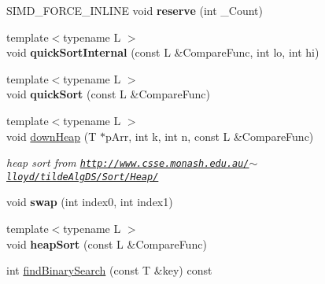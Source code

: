 \begin{DoxyCompactItemize}
\mbox{\label{classbtAlignedObjectArray_a0bcdc850355c6742c66d50b16b102d9d}} 
S\+I\+M\+D\+\_\+\+F\+O\+R\+C\+E\+\_\+\+I\+N\+L\+I\+NE void {\bfseries reserve} (int \+\_\+\+Count)
\item 
\mbox{\label{classbtAlignedObjectArray_afd02193777d3644c1202bd430cd47ec3}} 
{\footnotesize template$<$typename L $>$ }\\void {\bfseries quick\+Sort\+Internal} (const L \&Compare\+Func, int lo, int hi)
\item 
\mbox{\label{classbtAlignedObjectArray_a96e9890d9c406d43b53b0e5ff0723b2f}} 
{\footnotesize template$<$typename L $>$ }\\void {\bfseries quick\+Sort} (const L \&Compare\+Func)
\item 
\mbox{\label{classbtAlignedObjectArray_af763a60de2f11089bb10ebff2c062642}} 
{\footnotesize template$<$typename L $>$ }\\void \hyperlink{classbtAlignedObjectArray_af763a60de2f11089bb10ebff2c062642}{down\+Heap} (T $\ast$p\+Arr, int k, int n, const L \&Compare\+Func)
\begin{DoxyCompactList}\small\item\em heap sort from \href{http://www.csse.monash.edu.au/~lloyd/tildeAlgDS/Sort/Heap/}{\tt http\+://www.\+csse.\+monash.\+edu.\+au/$\sim$lloyd/tilde\+Alg\+D\+S/\+Sort/\+Heap/} \end{DoxyCompactList}\item 
\mbox{\label{classbtAlignedObjectArray_a4aeacaa461686c9394aabd3c139179b4}} 
void {\bfseries swap} (int index0, int index1)
\item 
\mbox{\label{classbtAlignedObjectArray_aa0979d77c9b1e397d656a0b1ef88b4e6}} 
{\footnotesize template$<$typename L $>$ }\\void {\bfseries heap\+Sort} (const L \&Compare\+Func)
\item 
\mbox{\label{classbtAlignedObjectArray_ac63dc886b2cb46a2e1084b0d9d0dbdb3}} 
int \hyperlink{classbtAlignedObjectArray_ac63dc886b2cb46a2e1084b0d9d0dbdb3}{find\+Binary\+Search} (const T \&key) const

\end{DoxyCompactItemize}

